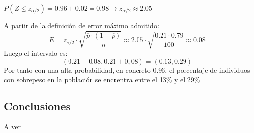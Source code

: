 $P\left(Z \leqslant z_{\alpha / 2} \right)= 0.96 + 0.02 = 0.98 \to z_{\alpha / 2} \approx 2.05$
 
A partir de la definición de error máximo admitido:
$$E=z_{\alpha / 2}\cdot \sqrt{\frac{\overline{p}\cdot\left(1-\overline{p} \right)}{n}}\approx 2.05 \cdot \sqrt{\frac{0.21\cdot 0.79}{100}}\approx 0.08$$
Luego el intervalo es: \\ 
$$\left( 0.21 - 0.08 , 0.21 + 0,08 \right) = \left(0.13, 0.29 \right)
$$
Por tanto con una alta probabilidad, en concreto 0.96, el porcentaje de individuos con sobrepeso en la población se encuentra entre el 13\% y el 29\% 

\subsection{Conclusiones} A ver





